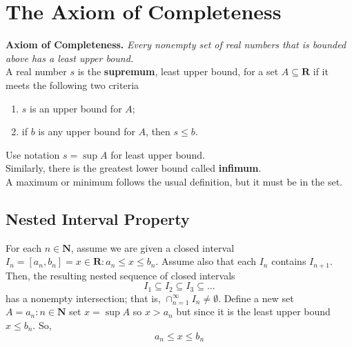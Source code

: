 \section{The Axiom of Completeness}
\textbf{Axiom of Completeness. }\textit{Every nonempty set of real numbers that is bounded above has a least upper bound.} \\
A real number $ s $ is the \textbf{supremum}, least upper bound, for a set $ A \subseteq \textbf{R} $ if it meets the following two criteria
\begin{enumerate}
	\item $ s $ is an upper bound for $ A $;
	\item if $ b $ is any upper bound for $ A $, then $ s \leq b $.
\end{enumerate}
Use notation $ s = \sup A $ for least upper bound. \\
Similarly, there is the greatest lower bound called \textbf{infimum}. \\
A maximum or minimum follows the usual definition, but it must be in the set.
\subsection{Nested Interval Property}
\begin{theorem}
	For each $ n \in \textbf{N} $, assume we are given a closed interval $ I_n = [a_n, b_n] = {x \in \textbf{R}: a_n \leq x \leq b_n}$. Assume also that each $ I_n $ contains $ I_{n+1} $. Then, the resulting nested sequence of closed intervals
	\[ I_1 \subseteq I_2 \subseteq I_3 \subseteq ... \]
	has a nonempty intersection; that is, $ \cap_{n =1}^\infty I_n \neq \emptyset$.
	Define a new set $ A = {a_n : n \in \textbf{N}} $ set $ x = \sup A $ so $ x > a_n $ but since it is the least upper bound $ x \leq b_n $. So, \[ a_n \leq x \leq b_n \]
\end{theorem}
